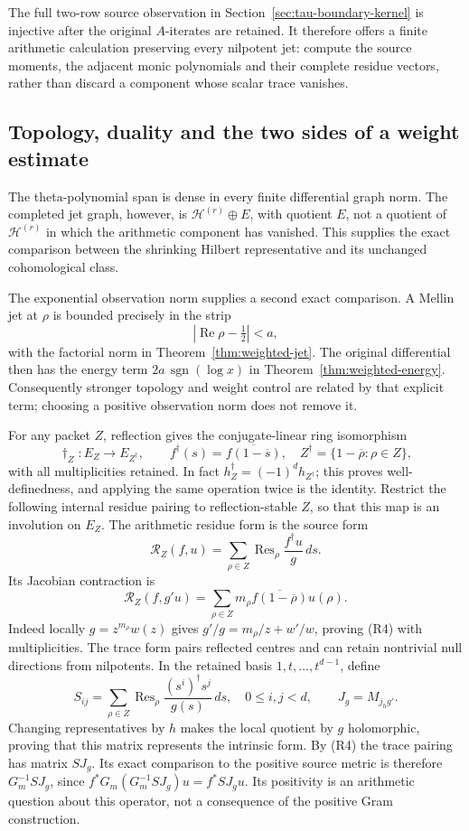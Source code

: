 The full two-row source observation in
Section~\ref{sec:tau-boundary-kernel} is injective after the
original \(A\)-iterates are retained. It therefore offers a
finite arithmetic calculation preserving every nilpotent jet:
compute the source moments, the adjacent monic polynomials and
their complete residue vectors, rather than discard a component
whose scalar trace vanishes.

\subsection{Topology, duality and the two sides of a weight estimate}
The theta-polynomial span is dense in every finite differential
graph norm. The completed jet graph, however, is
\(\mathscr H^{(r)}\oplus E\), with quotient \(E\), not a
quotient of \(\mathscr H^{(r)}\) in which the arithmetic
component has vanished. This supplies the exact comparison
between the shrinking Hilbert representative and its unchanged
cohomological class.

The exponential observation norm supplies a second exact
comparison. A Mellin jet at \(\rho\) is bounded precisely in
the strip
\[
 |\operatorname{Re}\rho-\tfrac12|<a,
\]
with the factorial norm in Theorem~\ref{thm:weighted-jet}.
The original differential then has the energy term
\(2a\,\operatorname{sgn}(\log x)\) in
Theorem~\ref{thm:weighted-energy}.
Consequently stronger topology and weight control are related
by that explicit term; choosing a positive observation norm
does not remove it.

For any packet \(Z\), reflection gives the conjugate-linear ring
isomorphism
\[
 \dagger_Z:E_Z\longrightarrow E_{Z^\dagger},\qquad
 f^\dagger(s)=\overline{f(1-\overline s)},\quad
 Z^\dagger=\{1-\overline\rho:\rho\in Z\},
\]
with all multiplicities retained. In fact
\(h_Z^\dagger=(-1)^dh_{Z^\dagger}\); this proves well-definedness,
and applying the same operation twice is the identity. Restrict
the following internal residue pairing to reflection-stable
\(Z\), so that this map is an involution on \(E_Z\).
The arithmetic residue form is the source form
\[
 \mathcal R_Z(f,u)=\sum_{\rho\in Z}
             \operatorname{Res}_\rho\frac{f^\dagger u}{g}\,ds .
\]
Its Jacobian contraction is
\[
 \mathcal R_Z(f,g'u)
 =\sum_{\rho\in Z}m_\rho\overline{f(1-\overline\rho)}u(\rho).
 \tag{R4}
\]
Indeed locally \(g=z^{m_\rho}w(z)\) gives
\(g'/g=m_\rho/z+w'/w\), proving (R4) with multiplicities.
The trace form pairs reflected centres and can retain
nontrivial null directions from nilpotents.
In the retained basis \(1,t,\ldots,t^{d-1}\), define
\[
 S_{ij}=\sum_{\rho\in Z}\operatorname{Res}_\rho
       \frac{(s^i)^\dagger s^j}{g(s)}\,ds,
 \quad 0\leq i,j<d,\qquad J_g=M_{j_hg'}.
\]
Changing representatives by \(h\) makes the local quotient by
\(g\) holomorphic, proving that this matrix represents the
intrinsic form. By (R4) the trace pairing has matrix \(SJ_g\).
Its exact comparison to the positive source metric is therefore
\(G_m^{-1}SJ_g\), since
\(f^*G_m(G_m^{-1}SJ_g)u=f^*SJ_gu\).
Its positivity is an arithmetic question about this operator,
not a consequence of the positive Gram construction.

